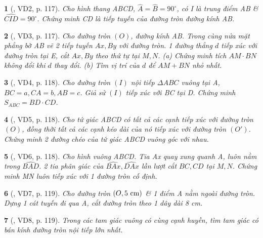 \documentclass{article}
\newtheorem{baitoan}{}
\begin{document}
\begin{baitoan}[\cite{Binh_boi_duong_Toan_9_tap_1}, VD2, p. 117]
	Cho hình thang ABCD, $\widehat{A} = \widehat{B} = 90^\circ$, có I là trung điểm AB \& $\widehat{CID} = 90^\circ$. Chứng minh CD là tiếp tuyến của đường tròn đường kính AB.
\end{baitoan}

\begin{baitoan}[\cite{Binh_boi_duong_Toan_9_tap_1}, VD3, p. 117]
	Cho đường tròn $(O)$, đường kính AB. Trong cùng nửa mặt phẳng bờ AB vẽ 2 tiếp tuyến $Ax,By$ với đường tròn. 1 đường thẳng $d$ tiếp xúc với đường tròn tại E, cắt $Ax,By$ theo thứ tự tại $M,N$. (a) Chứng minh tích $AM\cdot BN$ không đổi khi $d$ thay đổi. (b) Tìm vị trí của $d$ để $AM + BN$ nhỏ nhất.
\end{baitoan}

\begin{baitoan}[\cite{Binh_boi_duong_Toan_9_tap_1}, VD4, p. 118]
	Cho đường tròn $(I)$ nội tiếp $\Delta ABC$ vuông tại A, $BC = a,CA = b,AB = c$. Giả sử $(I)$ tiếp xúc với BC tại D. Chứng minh $S_{ABC} = BD\cdot CD$.
\end{baitoan}

\begin{baitoan}[\cite{Binh_boi_duong_Toan_9_tap_1}, VD5, p. 118]
	Cho tứ giác ABCD có tất cả các cạnh tiếp xúc với đường tròn $(O)$, đồng thời tất cả các cạnh kéo dài của nó tiếp xúc với đường tròn $(O')$. Chứng minh 2 đường chéo của tứ giác ABCD vuông góc với nhau.
\end{baitoan}

\begin{baitoan}[\cite{Binh_boi_duong_Toan_9_tap_1}, VD6, p. 118]
	Cho hình vuông ABCD. Tia Ax quay xung quanh A, luôn nằm trong $\widehat{BAD}$. 2 tia phân giác của $\widehat{BAx},\widehat{DAx}$ lần lượt cắt $BC,CD$ tại $M,N$. Chứng minh MN luôn tiếp xúc với 1 đường tròn cố định.
\end{baitoan}

\begin{baitoan}[\cite{Binh_boi_duong_Toan_9_tap_1}, VD7, p. 119]
	Cho đường tròn $(O,5\ {\rm cm})$ \& 1 điểm A nằm ngoài đường tròn. Dựng 1 cát tuyến đi qua A, cắt đường tròn theo 1 dây dài {\rm8 cm}.
\end{baitoan}

\begin{baitoan}[\cite{Binh_boi_duong_Toan_9_tap_1}, VD8, p. 119]
	Trong các tam giác vuông có cùng cạnh huyền, tìm tam giác có bán kính đường tròn nội tiếp lớn nhất.
\end{baitoan}
\end{document}
